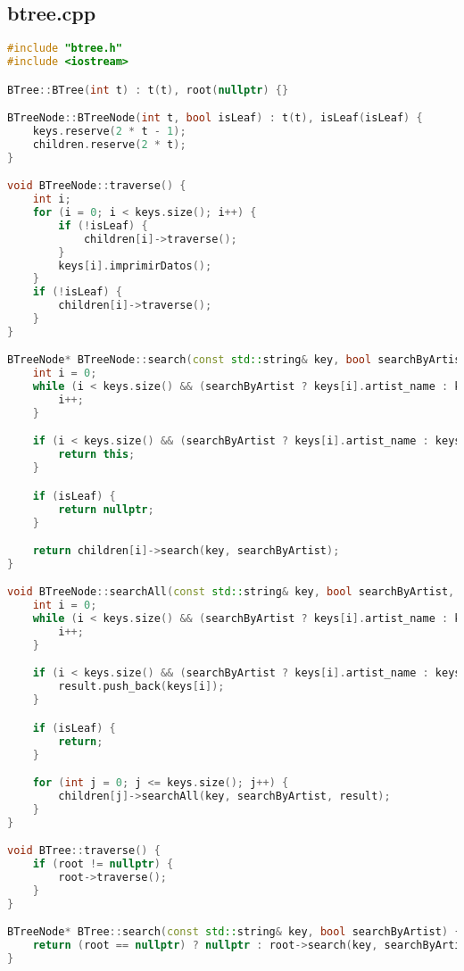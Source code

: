 \documentclass[corference]{IEEEtran}
\begin{document}
\begin{flushleft}
            \vspace{1cm}
        \subsection{btree.cpp}
            \begin{lstlisting}[language=C++, style=mystyle, caption={Código de un Árbol B}]
#include "btree.h"
#include <iostream>

BTree::BTree(int t) : t(t), root(nullptr) {}

BTreeNode::BTreeNode(int t, bool isLeaf) : t(t), isLeaf(isLeaf) {
    keys.reserve(2 * t - 1);
    children.reserve(2 * t);
}

void BTreeNode::traverse() {
    int i;
    for (i = 0; i < keys.size(); i++) {
        if (!isLeaf) {
            children[i]->traverse();
        }
        keys[i].imprimirDatos();
    }
    if (!isLeaf) {
        children[i]->traverse();
    }
}

BTreeNode* BTreeNode::search(const std::string& key, bool searchByArtist) {
    int i = 0;
    while (i < keys.size() && (searchByArtist ? keys[i].artist_name : keys[i].track_name) < key) {
        i++;
    }

    if (i < keys.size() && (searchByArtist ? keys[i].artist_name : keys[i].track_name) == key) {
        return this;
    }

    if (isLeaf) {
        return nullptr;
    }

    return children[i]->search(key, searchByArtist);
}

void BTreeNode::searchAll(const std::string& key, bool searchByArtist, std::vector<Cancion>& result) {
    int i = 0;
    while (i < keys.size() && (searchByArtist ? keys[i].artist_name : keys[i].track_name) < key) {
        i++;
    }

    if (i < keys.size() && (searchByArtist ? keys[i].artist_name : keys[i].track_name) == key) {
        result.push_back(keys[i]);
    }

    if (isLeaf) {
        return;
    }

    for (int j = 0; j <= keys.size(); j++) {
        children[j]->searchAll(key, searchByArtist, result);
    }
}

void BTree::traverse() {
    if (root != nullptr) {
        root->traverse();
    }
}

BTreeNode* BTree::search(const std::string& key, bool searchByArtist) {
    return (root == nullptr) ? nullptr : root->search(key, searchByArtist);
}


\end{lstlisting}
\end{flushleft}
\end{document}
